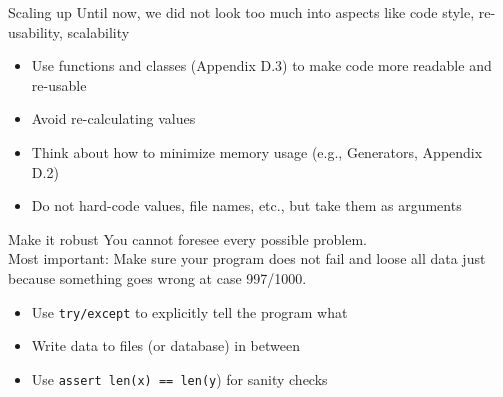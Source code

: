 \documentclass{beamer}
\begin{document}
\begin{frame}{Scaling up}
	Until now, we did not look too much into aspects like code style, re-usability, scalability
	\begin{itemize}
		\item Use functions and classes (Appendix D.3) to make code more readable and re-usable
		\item Avoid re-calculating values
		\item Think about how to minimize memory usage (e.g., Generators, Appendix D.2)
		\item Do not hard-code values, file names, etc., but take them as arguments
	\end{itemize}	
\end{frame}




\begin{frame}{Make it robust}
You cannot foresee every possible problem.\\
Most important: Make sure your program does not fail and loose all data just because something goes wrong at case 997/1000.
	\begin{itemize}
		\item Use \texttt{try/except} to explicitly tell the program what
		\item Write data to files (or database) in between
		\item Use \texttt{assert len(x) == len(y}) for sanity checks
	\end{itemize}	
\end{frame}


%
%






\end{document}
